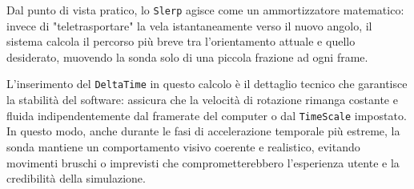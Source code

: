 Dal punto di vista pratico, lo \lstinline|Slerp| agisce come un ammortizzatore matematico: invece di "teletrasportare" la vela istantaneamente verso il nuovo angolo, il sistema calcola il percorso più breve tra l'orientamento attuale e quello desiderato, muovendo la sonda solo di una piccola frazione ad ogni frame.

L'inserimento del \lstinline|DeltaTime| in questo calcolo è il dettaglio tecnico che garantisce la stabilità del software: assicura che la velocità di rotazione rimanga costante e fluida indipendentemente dal framerate del computer o dal \lstinline|TimeScale| impostato. In questo modo, anche durante le fasi di accelerazione temporale più estreme, la sonda mantiene un comportamento visivo coerente e realistico, evitando movimenti bruschi o imprevisti che comprometterebbero l'esperienza utente e la credibilità della simulazione.

